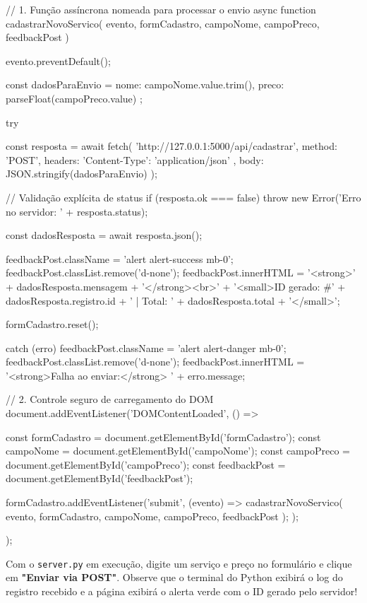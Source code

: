 \begin{boxCodigoJS}
// 1. Função assíncrona nomeada para processar o envio
async function cadastrarNovoServico(
  evento,
  formCadastro,
  campoNome,
  campoPreco,
  feedbackPost
) {
  evento.preventDefault();

  const dadosParaEnvio = {
    nome: campoNome.value.trim(),
    preco: parseFloat(campoPreco.value)
  };

  try {
    const resposta = await fetch(
      'http://127.0.0.1:5000/api/cadastrar',
      {
        method: 'POST',
        headers: {
          'Content-Type': 'application/json'
        },
        body: JSON.stringify(dadosParaEnvio)
      }
    );

    // Validação explícita de status
    if (resposta.ok === false) {
      throw new Error('Erro no servidor: ' + resposta.status);
    }

    const dadosResposta = await resposta.json();

    feedbackPost.className = 'alert alert-success mb-0';
    feedbackPost.classList.remove('d-none');
    feedbackPost.innerHTML =
      '<strong>' + dadosResposta.mensagem + '</strong><br>' +
      '<small>ID gerado: #' + dadosResposta.registro.id +
      ' | Total: ' + dadosResposta.total + '</small>';

    formCadastro.reset();

  } catch (erro) {
    feedbackPost.className = 'alert alert-danger mb-0';
    feedbackPost.classList.remove('d-none');
    feedbackPost.innerHTML =
      '<strong>Falha ao enviar:</strong> ' + erro.message;
  }
}

// 2. Controle seguro de carregamento do DOM
document.addEventListener('DOMContentLoaded', () => {
  const formCadastro = document.getElementById('formCadastro');
  const campoNome = document.getElementById('campoNome');
  const campoPreco = document.getElementById('campoPreco');
  const feedbackPost = document.getElementById('feedbackPost');

  formCadastro.addEventListener('submit', (evento) => {
    cadastrarNovoServico(
      evento,
      formCadastro,
      campoNome,
      campoPreco,
      feedbackPost
    );
  });
});
\end{boxCodigoJS}

\begin{boxTeste}
Com o \texttt{server.py} em execução, digite um serviço e preço no formulário e clique em \textbf{"Enviar via POST"}. Observe que o terminal do Python exibirá o log do registro recebido e a página exibirá o alerta verde com o ID gerado pelo servidor!
\end{boxTeste}

